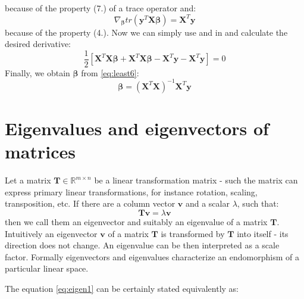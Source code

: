 \begin{appendices}
because of the property (7.) of a trace operator and:
\begin{equation}\label{eq:least5}
    \nabla_{\boldsymbol{\beta}}tr(\boldsymbol{y}^T\boldsymbol{X}\boldsymbol{\beta}) = \boldsymbol{X}^T\boldsymbol{y}
\end{equation}
because of the property (4.).
Now we can simply use  and  in  and calculate the desired derivative:
\begin{equation}\label{eq:least6}
    \frac{1}{2}[\boldsymbol{X}^T\boldsymbol{X}\boldsymbol{\beta}+\boldsymbol{X}^T\boldsymbol{X}\boldsymbol{\beta}-\boldsymbol{X}^T\boldsymbol{y}-\boldsymbol{X}^T\boldsymbol{y}] = 0
\end{equation}
Finally, we obtain $\boldsymbol{\beta}$ from \cref{eq:least6}:
\begin{equation}
    \boldsymbol{\beta}=(\boldsymbol{X}^T\boldsymbol{X})^{-1}\boldsymbol{X}^T\boldsymbol{y}
\end{equation}

\newpage
\section{Eigenvalues and eigenvectors of matrices}
\label{app:eigen}

Let a matrix $\boldsymbol{T} \in \mathbb{R}^{m \times n}$ be a linear transformation matrix - such the matrix can express primary linear transformations, for instance rotation, scaling, transposition, etc. If there are a column vector $\boldsymbol{v}$ and a scalar $\lambda$, such that:
\begin{equation}\label{eq:eigen1}
    \boldsymbol{T}\boldsymbol{v}=\lambda{\boldsymbol{v}}
\end{equation}
then we call them an eigenvector and suitably an eigenvalue of a matrix $\boldsymbol{T}$. Intuitively an eigenvector $\boldsymbol{v}$ of a matrix $\boldsymbol{T}$ is transformed by $\boldsymbol{T}$ into itself - its direction does not change. An eigenvalue can be then interpreted as a scale factor. Formally eigenvectors and eigenvalues characterize an endomorphism of a particular linear space.  

The equation \ref{eq:eigen1} can be certainly stated equivalently as:


\end{appendices}
